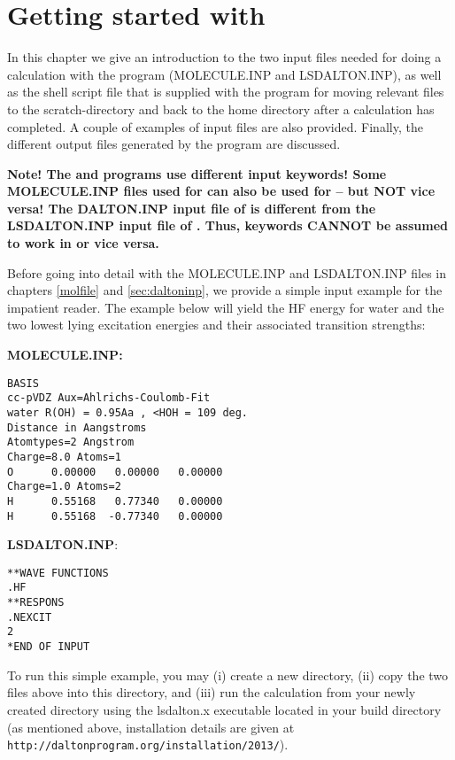 \chapter{Getting started with {\lsdalton}}\label{ch:starting}

In this chapter we give an introduction to the two input files needed
for doing a calculation with the {\lsdalton} program
(MOLECULE.INP and LSDALTON.INP), as well as the
shell script file that is supplied with the program for moving
relevant files to the scratch-directory and back to the home directory
after a calculation has completed. A couple of examples of
input files  are also provided. Finally, the different output files
generated by the program are discussed.

\textbf{Note! The {\dalton} and {\lsdalton} programs use different input keywords! Some MOLECULE.INP files used for {\lsdalton} can also be used for 
 {\dalton} -- but NOT vice versa! The DALTON.INP input file of  {\dalton} is different from the LSDALTON.INP input file of {\lsdalton}.
Thus, {\dalton} keywords CANNOT be assumed to work in {\lsdalton} or vice versa.}

Before going into detail with the 
MOLECULE.INP and LSDALTON.INP files in chapters \ref{molfile} and \ref{sec:daltoninp},
we provide a simple input example for the impatient reader. The example below
will yield the HF energy for water and the
two lowest lying excitation energies and their associated transition strengths:

\vspace{1 cm}

{\noindent \textbf{MOLECULE.INP:}}
\begin{verbatim}
BASIS
cc-pVDZ Aux=Ahlrichs-Coulomb-Fit
water R(OH) = 0.95Aa , <HOH = 109 deg.
Distance in Aangstroms
Atomtypes=2 Angstrom
Charge=8.0 Atoms=1
O      0.00000   0.00000   0.00000
Charge=1.0 Atoms=2
H      0.55168   0.77340   0.00000
H      0.55168  -0.77340   0.00000
\end{verbatim} 

\vspace{1 cm}

{\noindent \textbf{LSDALTON.INP}:}
\begin{verbatim}
**WAVE FUNCTIONS
.HF
**RESPONS
.NEXCIT
2
*END OF INPUT
\end{verbatim}

To run this simple example, you may (i) create a new directory, (ii) copy the two files above into this directory,
and (iii) run the calculation from your newly created directory using the lsdalton.x executable located in your build directory (as mentioned above, installation details are given at 
\verb|http://daltonprogram.org/installation/2013/|).

